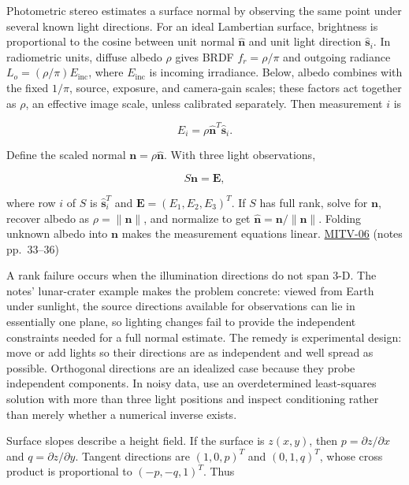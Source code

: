 Photometric stereo estimates a surface normal by observing the same point under several known light directions. For an ideal Lambertian surface, brightness is proportional to the cosine between unit normal \(\hat{\mathbf{n}}\) and unit light direction \(\hat{\mathbf{s}}_i\). In radiometric units, diffuse albedo \(\rho\) gives BRDF \(f_r=\rho/\pi\) and outgoing radiance \(L_o=(\rho/\pi)E_{\mathrm{inc}}\), where \(E_{\mathrm{inc}}\) is incoming irradiance. Below, albedo combines with the fixed \(1/\pi\), source, exposure, and camera-gain scales; these factors act together as \(\rho\), an effective image scale, unless calibrated separately. Then measurement \(i\) is

\[
E_i=\rho\hat{\mathbf{n}}^T\hat{\mathbf{s}}_i.
\]

Define the scaled normal \(\mathbf{n}=\rho\hat{\mathbf{n}}\). With three light observations,

\[
S\mathbf{n}=\mathbf{E},
\]

where row \(i\) of \(S\) is \(\hat{\mathbf{s}}_i^T\) and \(\mathbf{E}=(E_1,E_2,E_3)^T\). If \(S\) has full rank, solve for \(\mathbf{n}\), recover albedo as \(\rho=\|\mathbf{n}\|\), and normalize to get \(\hat{\mathbf{n}}=\mathbf{n}/\|\mathbf{n}\|\). Folding unknown albedo into \(\mathbf{n}\) makes the measurement equations linear. \hyperref[04-visual-computing-ii-ch036-mitv-06---photometric-stereo-noise-gain-error-amplification-eigenvalues-and-eigenvectors-review]{MITV-06} (notes pp.~33--36)

A rank failure occurs when the illumination directions do not span 3-D. The notes' lunar-crater example makes the problem concrete: viewed from Earth under sunlight, the source directions available for observations can lie in essentially one plane, so lighting changes fail to provide the independent constraints needed for a full normal estimate. The remedy is experimental design: move or add lights so their directions are as independent and well spread as possible. Orthogonal directions are an idealized case because they probe independent components. In noisy data, use an overdetermined least-squares solution with more than three light positions and inspect conditioning rather than merely whether a numerical inverse exists.

Surface slopes describe a height field. If the surface is \(z(x,y)\), then \(p=\partial z/\partial x\) and \(q=\partial z/\partial y\). Tangent directions are \((1,0,p)^T\) and \((0,1,q)^T\), whose cross product is proportional to \((-p,-q,1)^T\). Thus

